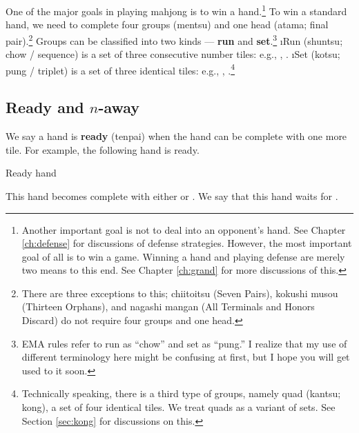 One of the major goals in playing mahjong is to win a hand.\footnote{Another important goal is not to deal into an opponent's hand. See Chapter \ref{ch:defense} for discussions of defense strategies. However, the most important goal of all is to win a game. Winning a hand and playing defense are merely two means to this end. See Chapter \ref{ch:grand} for more discussions of this.}
To win a standard hand, we need to complete four groups ({\jap mentsu}) and one head ({\jap atama}; final pair).\footnote{There are three exceptions to this; {\jap chiitoitsu} (Seven Pairs), {\jap kokushi musou} (Thirteen Orphans), and {\jap nagashi mangan} (All Terminals and Honors Discard) do not require four groups and one head.} 
Groups can be classified into two kinds --- {\bf run} and {\bf set}.\footnote{EMA rules refer to run as ``chow'' and set as ``pung.'' I realize that my use of different terminology here might be confusing at first, but I hope you will get used to it soon.}
\bi
\i Run ({\jap shuntsu}; chow / sequence) is a set of three consecutive number tiles: e.g., {\LARGE {}}, {\LARGE {}}. 
\i Set ({\jap kotsu}; pung / triplet) is a set of three identical tiles: e.g., {\LARGE {}}, {\LARGE \fa\fa\fa}.\footnote{Technically speaking, there is a third type of groups, namely quad ({\jap kantsu}; kong), a set of four identical tiles. We treat quads as a variant of sets. See Section \ref{sec:kong} for discussions on this.} 
\ei
 

\subsection{Ready and $n$-away}
	 
We say a hand is {\bf ready} ({\jap tenpai}) when the hand can be complete with one more tile. For example, the following hand is ready. 
\bigskip
\begin{itembox}[r]{Ready hand}
\bp
{}\zhong\zhong\zhong
\ep
\end{itembox}
This hand becomes complete with either {\LARGE{}} or {\LARGE{}}. We say that this hand waits for {\LARGE{} }.

\bigskip

